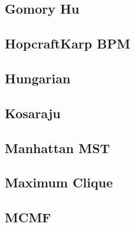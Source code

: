 \subsection{Gomory Hu}
\vspace{-2ex}
\raggedbottom
\vspace{-3.2ex}
\hrulefill
\subsection{HopcraftKarp BPM}
\vspace{-2ex}
\raggedbottom
\vspace{-3.2ex}
\hrulefill
\subsection{Hungarian}
\vspace{-2ex}
\raggedbottom
\vspace{-3.2ex}
\hrulefill
\subsection{Kosaraju}
\vspace{-2ex}
\raggedbottom
\vspace{-3.2ex}
\hrulefill
\subsection{Manhattan MST}
\vspace{-2ex}
\raggedbottom
\vspace{-3.2ex}
\hrulefill
\subsection{Maximum Clique}
\vspace{-2ex}
\raggedbottom
\vspace{-3.2ex}
\hrulefill
\subsection{MCMF}
\vspace{-2ex}
\raggedbottom
\vspace{-3.2ex}
\hrulefill
